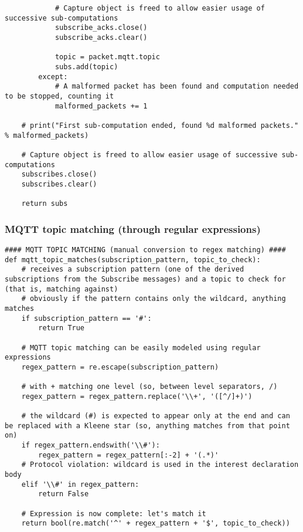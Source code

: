 \documentclass[a4paper,11pt]{article} %
\begin{document}
\begin{verbatim}
            # Capture object is freed to allow easier usage of successive sub-computations
            subscribe_acks.close()
            subscribe_acks.clear()

            topic = packet.mqtt.topic
            subs.add(topic)
        except:
            # A malformed packet has been found and computation needed to be stopped, counting it
            malformed_packets += 1

    # print("First sub-computation ended, found %d malformed packets." % malformed_packets)

    # Capture object is freed to allow easier usage of successive sub-computations
    subscribes.close()
    subscribes.clear()

    return subs
    \end{verbatim}

    \subsubsection{MQTT topic matching (through regular expressions)}

    \begin{verbatim}
#### MQTT TOPIC MATCHING (manual conversion to regex matching) ####
def mqtt_topic_matches(subscription_pattern, topic_to_check):
    # receives a subscription pattern (one of the derived subscriptions from the Subscribe messages) and a topic to check for (that is, matching against)
    # obviously if the pattern contains only the wildcard, anything matches
    if subscription_pattern == '#':
        return True

    # MQTT topic matching can be easily modeled using regular expressions
    regex_pattern = re.escape(subscription_pattern)

    # with + matching one level (so, between level separators, /)
    regex_pattern = regex_pattern.replace('\\+', '([^/]+)')

    # the wildcard (#) is expected to appear only at the end and can be replaced with a Kleene star (so, anything matches from that point on)
    if regex_pattern.endswith('\\#'):
        regex_pattern = regex_pattern[:-2] + '(.*)'
    # Protocol violation: wildcard is used in the interest declaration body
    elif '\\#' in regex_pattern:
        return False

    # Expression is now complete: let's match it
    return bool(re.match('^' + regex_pattern + '$', topic_to_check))
    \end{verbatim}
\end{document}
